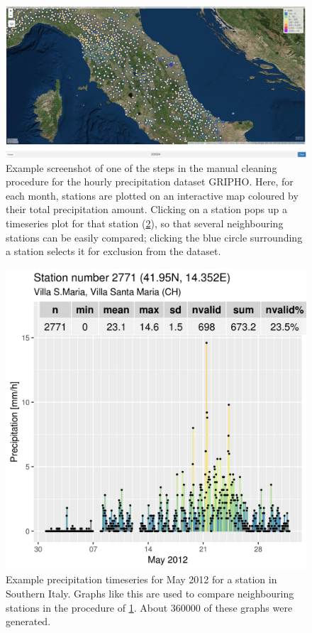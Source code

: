\begin{figure}
    \centering
    \includegraphics[width=\textwidth]{figures/rain_dst/clean_dewrain_screenshot}
    \decoRule
    \caption[Manual cleaning procedure for the precipitation dataset  GRIPHO]{Example screenshot of one of the steps in the manual cleaning procedure for the hourly precipitation dataset GRIPHO. Here, for each month, stations are plotted on an interactive map coloured by their total precipitation amount. Clicking on a station pops up a timeseries plot for that station (\cref{fig:ts_dewrain_example}), so that several neighbouring stations can be easily compared; clicking the blue circle surrounding a station selects it for exclusion from the dataset.} \label{fig:clean_dewrain_screenshot}
\end{figure}
\begin{figure}
    \centering
    \includegraphics[width=\textwidth]{figures/rain_dst/ts_dewrain_example}
    \decoRule
    \caption[Example timeseries popup for the cleaning of the precipitation dataset GRIPHO]{Example precipitation timeseries for May 2012 for a station in Southern Italy. Graphs like this are used to compare neighbouring stations in the procedure of \cref{fig:clean_dewrain_screenshot}. About 360000 of these graphs were generated.} \label{fig:ts_dewrain_example}
\end{figure}

